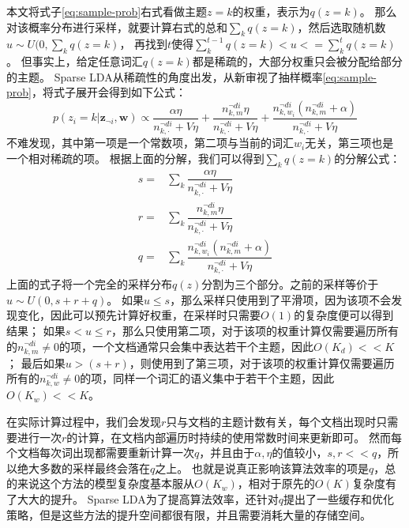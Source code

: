 本文将式子\ref{eq:sample-prob}右式看做主题$z=k$的权重，表示为$q(z = k)$。
那么对该概率分布进行采样，就要计算右式的总和$\sum_k{q(z = k)}$，然后选取随机数$u \sim U(0, \sum_k{q(z= k)}$，
再找到$t$使得$\sum_k^{t-1}{q(z=k)} < u <= \sum_k^{t}{q(z=k)}$。
但事实上，给定任意词汇$q(z=k)$都是稀疏的，大部分权重只会被分配给部分的主题。
Sparse LDA从稀疏性的角度出发，从新审视了抽样概率\ref{eq:sample-prob}，将式子展开会得到如下公式：
\begin{equation}
\label{eq:sparse-sample-prob}
p( z_i = k | \mathbf{z}_{\neg i},  \mathbf{w}) 
	\propto  \dfrac{\alpha \eta }{ n_{k, \cdot}^{\neg di} + V\eta} + 
	\dfrac{ n_{k, m}^{\neg di} \eta }{ n_{k, \cdot}^{\neg di} + V\eta} +
	\dfrac{ n_{k, w_i}^{\neg di} (n_{k, m}^{\neg di} + \alpha)}{ n_{k, \cdot}^{\neg di} + V\eta}
\end{equation}
不难发现，其中第一项是一个常数项，第二项与当前的词汇$w_i$无关，第三项也是一个相对稀疏的项。
根据上面的分解，我们可以得到$\sum_k{q(z=k)}$的分解公式：
\begin{align}
s =& \sum_k {  \dfrac{\alpha \eta }{ n_{k, \cdot}^{\neg di} + V\eta}}\\
r =& \sum_k {\dfrac{ n_{k, m}^{\neg di} \eta }{ n_{k, \cdot}^{\neg di} + V\eta}}\\
q =& \sum_k {\dfrac{ n_{k, w_i}^{\neg di} (n_{k, m}^{\neg di} + \alpha)}{ n_{k, \cdot}^{\neg di} + V\eta}}
\end{align}
上面的式子将一个完全的采样分布$q(z)$分割为三个部分。之前的采样等价于$u \sim U(0, s + r + q)$。
如果$u \le s$，那么采样只使用到了平滑项，因为该项不会发现变化，因此可以预先计算好权重，在采样时只需要$O(1)$的复杂度便可以得到结果；
如果$s < u \le r $，那么只使用第二项，对于该项的权重计算仅需要遍历所有的$ n_{k, m}^{\neg di} \ne 0$的项，一个文档通常只会集中表达若干个主题，因此$O(K_d) << K$；
最后如果$ u > (s + r) $，则使用到了第三项，对于该项的权重计算仅需要遍历所有的$ n_{k, w}^{\neg di}\ne 0 $的项，同样一个词汇的语义集中于若干个主题，因此$O(K_w) << K$。

在实际计算过程中，我们会发现$r$只与文档的主题计数有关，每个文档出现时只需要进行一次$r$的计算，在文档内部遍历时持续的使用常数时间来更新即可。
然而每个文档每次词出现都需要重新计算一次$q$，并且由于$\alpha, \eta$的值较小，$s, r << q$，所以绝大多数的采样最终会落在$q$之上。
也就是说真正影响该算法效率的项是$q$，总的来说这个方法的模型复杂度基本服从$O(K_w)$，相对于原先的$O(K)$复杂度有了大大的提升。
Sparse LDA为了提高算法效率，还针对$q$提出了一些缓存和优化策略，但是这些方法的提升空间都很有限，并且需要消耗大量的存储空间。

